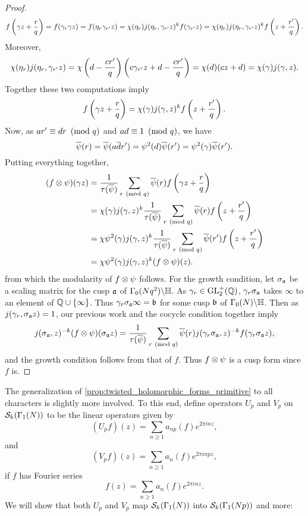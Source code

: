\begin{proof}
      \[
        f\left(\gamma z+\frac{r}{q}\right) = f(\gamma_{r}\gamma z) = f(\eta_{r}\gamma_{r'}z) = \chi(\eta_{r})j(\eta_{r},\gamma_{r'}z)^{k}f(\gamma_{r'}z) = \chi(\eta_{r})j(\eta_{r},\gamma_{r'}z)^{k}f\left(z+\frac{r'}{q}\right).
      \]
      Moreover,
      \[
        \chi(\eta_{r})j(\eta_{r},\gamma_{r'}z) = \chi\left(d-\frac{cr'}{q}\right)\left(c\gamma_{r'}z+d-\frac{cr'}{q}\right) = \chi(d)(cz+d) = \chi(\gamma)j(\gamma,z).
      \]
      Together these two computations imply
      \[
        f\left(\gamma z+\frac{r}{q}\right) = \chi(\gamma)j(\gamma,z)^{k}f\left(z+\frac{r'}{q}\right).
      \]
      Now, as $ar' \equiv dr \ \left(\text{mod }q\right)$ and $ad \equiv 1 \ \left(\text{mod }q\right)$, we have
      \[
        \overline{\psi}(r) = \overline{\psi}(a\overline{d}r') = \psi^{2}(d)\overline{\psi}(r') = \psi^{2}(\gamma)\overline{\psi}(r').
      \]
      Putting everything together,
      \begin{align*}
        (f \otimes \psi)(\gamma z) &= \frac{1}{\tau(\overline{\psi})}\sum_{r \ \left(\text{mod }q\right)}\overline{\psi}(r)f\left(\gamma z+\frac{r}{q}\right) \\
        &= \chi(\gamma)j(\gamma,z)^{k}\frac{1}{\tau(\overline{\psi})}\sum_{r \ \left(\text{mod }q\right)}\overline{\psi}(r)f\left(z+\frac{r'}{q}\right) \\
        &= \chi\psi^{2}(\gamma)j(\gamma,z)^{k}\frac{1}{\tau(\overline{\psi})}\sum_{r \ \left(\text{mod }q\right)}\overline{\psi}(r')f\left(z+\frac{r'}{q}\right) \\
        &= \chi\psi^{2}(\gamma)j(\gamma,z)^{k}(f \otimes \psi)(z).
      \end{align*}
      from which the modularity of $f \otimes \psi$ follows. For the growth condition, let $\sigma_{\mathfrak{a}}$ be a scaling matrix for the cusp $\mathfrak{a}$ of $\Gamma_{0}(Nq^{2})\backslash\mathbb{H}$. As $\gamma_{r} \in \mathrm{GL}_{2}^{+}(\mathbb{Q})$, $\gamma_{r}\sigma_{\mathfrak{a}}$ takes $\infty$ to an element of $\mathbb{Q} \cup \{\infty\}$. Thus $\gamma_{r}\sigma_{\mathfrak{a}}\infty = \mathfrak{b}$ for some cusp $\mathfrak{b}$ of $\Gamma_{0}(N)\backslash\mathbb{H}$. Then as $j(\gamma_{r},\sigma_{\mathfrak{a}}z) = 1$, our previous work and the cocycle condition together imply
      \[
        j(\sigma_{\mathfrak{a}},z)^{-k}(f \otimes \psi)(\sigma_{\mathfrak{a}}z) = \frac{1}{\tau(\overline{\psi})}\sum_{r \ \left(\text{mod }q\right)}\overline{\psi}(r)j(\gamma_{r}\sigma_{\mathfrak{a}},z)^{-k}f(\gamma_{r}\sigma_{\mathfrak{a}}z),
      \]
      and the growth condition follows from that of $f$. Thus $f \otimes \psi$ is a cusp form since $f$ is.
    \end{proof}

    The generalization of \cref{prop:twisted_holomorphic_forms_primitive} to all characters is slightly more involved. To this end, define operators $U_{p}$ and $V_{p}$ on $\mathcal{S}_{k}(\Gamma_{1}(N))$ to be the linear operators given by
    \[
      (U_{p}f)(z) = \sum_{n \ge 1}a_{np}(f)e^{2\pi inz},
    \]
    and
    \[
      (V_{p}f)(z) = \sum_{n \ge 1}a_{n}(f)e^{2\pi inpz},
    \]
    if $f$ has Fourier series
    \[
      f(z) = \sum_{n \ge 1}a_{n}(f)e^{2\pi inz}.
    \]
    We will show that both $U_{p}$ and $V_{p}$ map $\mathcal{S}_{k}(\Gamma_{1}(N))$ into $\mathcal{S}_{k}(\Gamma_{1}(Np))$ and more:

